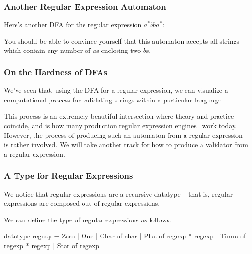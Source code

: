 \documentclass[aspectratio=169]{beamer}
\begin{document}
\begin{frame}[fragile]
  \frametitle{Another Regular Expression Automaton}

  Here's another DFA for the regular expression $a^*bba^*$:

  \vspace{\fill}


  \pause
  \vspace{\fill}

  You should be able to convince yourself that this automaton accepts
  all strings which contain any number of $a$s enclosing two $b$s.
\end{frame}



\begin{frame}[fragile]
  \frametitle{On the Hardness of DFAs}

  We've seen that, using the DFA for a regular expression, we can
  visualize a computational process for validating strings within a
  particular language.

  \pause
  \vspace{\fill}

  This process is an extremely beautiful intersection where theory and
  practice coincide, and is how many production regular expression engines\footnotemark 
  \, work today. However, the process of producing such an automaton from
  a regular expression is rather involved. We will take another track
  for how to produce a validator from a regular expression.

\end{frame}

\begin{frame}[fragile]
  \frametitle{A Type for Regular Expressions}

  \tgs

  We notice that regular expressions are a recursive datatype -- that is,
  regular expressions are composed out of regular expressions.

  \vspace{\fill}

  We can define the type of regular expressions as follows:

  \begin{codeblock}
    datatype regexp = 
        Zero
      | One
      | Char of char  
      | Plus of regexp * regexp
      | Times of regexp * regexp
      | Star of regexp
  \end{codeblock}
\end{frame}
\end{document}
